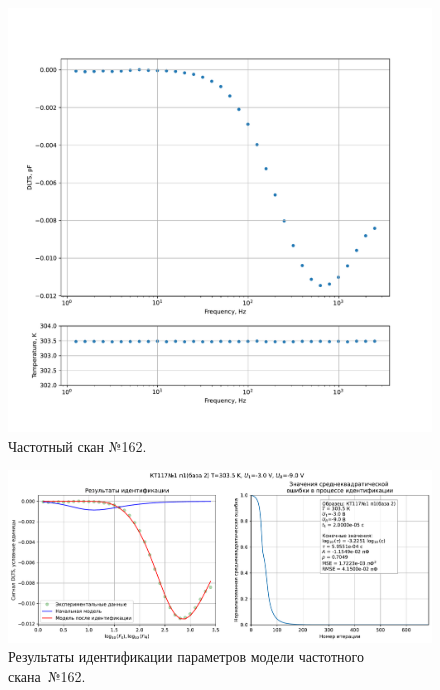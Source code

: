 \begin{figure}[!ht]
    \centering
    \includegraphics[width=1\textwidth]{../plots/КТ117№1_п1(база 2)_2500Гц-1Гц_1пФ_+30С_-3В-9В_200мВ_20мкс_шаг_0,1.pdf}
    \caption{Частотный скан №162.}
    \label{pic:frequency_scan_162}
\end{figure}

\begin{figure}[!ht]
    \centering
    \includegraphics[width=1\textwidth]{../plots/КТ117№1_п1(база 2)_2500Гц-1Гц_1пФ_+30С_-3В-9В_200мВ_20мкс_шаг_0,1_model.pdf}
    \caption{Результаты идентификации параметров модели частотного скана~№162.}
    \label{pic:frequency_scan_model162}
\end{figure}

\pagebreak


